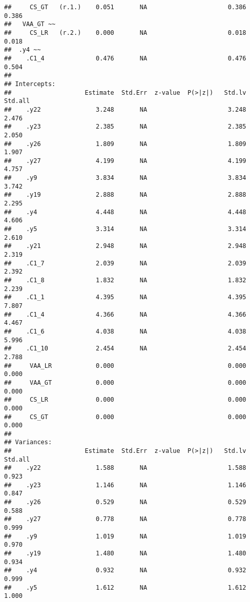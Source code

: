 \documentclass[
]{article}
\begin{document}
\begin{verbatim}
##     CS_GT   (r.1.)    0.051       NA                      0.386    0.386
##   VAA_GT ~~                                                             
##     CS_LR   (r.2.)    0.000       NA                      0.018    0.018
##  .y4 ~~                                                                 
##    .C1_4              0.476       NA                      0.476    0.504
## 
## Intercepts:
##                    Estimate  Std.Err  z-value  P(>|z|)   Std.lv  Std.all
##    .y22               3.248       NA                      3.248    2.476
##    .y23               2.385       NA                      2.385    2.050
##    .y26               1.809       NA                      1.809    1.907
##    .y27               4.199       NA                      4.199    4.757
##    .y9                3.834       NA                      3.834    3.742
##    .y19               2.888       NA                      2.888    2.295
##    .y4                4.448       NA                      4.448    4.606
##    .y5                3.314       NA                      3.314    2.610
##    .y21               2.948       NA                      2.948    2.319
##    .C1_7              2.039       NA                      2.039    2.392
##    .C1_8              1.832       NA                      1.832    2.239
##    .C1_1              4.395       NA                      4.395    7.807
##    .C1_4              4.366       NA                      4.366    4.467
##    .C1_6              4.038       NA                      4.038    5.996
##    .C1_10             2.454       NA                      2.454    2.788
##     VAA_LR            0.000                               0.000    0.000
##     VAA_GT            0.000                               0.000    0.000
##     CS_LR             0.000                               0.000    0.000
##     CS_GT             0.000                               0.000    0.000
## 
## Variances:
##                    Estimate  Std.Err  z-value  P(>|z|)   Std.lv  Std.all
##    .y22               1.588       NA                      1.588    0.923
##    .y23               1.146       NA                      1.146    0.847
##    .y26               0.529       NA                      0.529    0.588
##    .y27               0.778       NA                      0.778    0.999
##    .y9                1.019       NA                      1.019    0.970
##    .y19               1.480       NA                      1.480    0.934
##    .y4                0.932       NA                      0.932    0.999
##    .y5                1.612       NA                      1.612    1.000

\end{verbatim}
\end{document}
